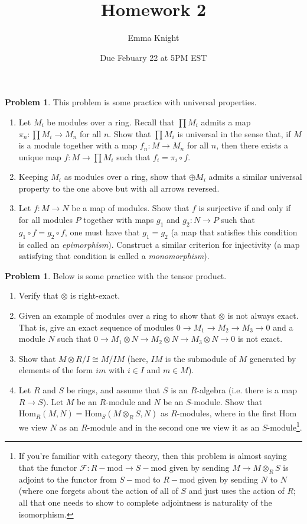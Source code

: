 \documentclass[11pt]{article}
\title{Homework 2}
\author{Emma Knight}
\date{Due Febuary 22 at 5PM EST}
\theoremstyle{definition}
\newtheorem{problem}[theorem]{Problem}
\theoremstyle{definition}
\begin{document}
\maketitle
\begin{problem}This problem is some practice with universal properties.
\begin{enumerate}[label=(\alph*)]
\item Let $M_i$ be modules over a ring.  Recall that $\prod M_i$ admits a map $\pi_n : \prod M_i \rightarrow M_n$ for all $n$.  Show that $\prod M_i$ is universal in the sense that, if $M$ is a module together with a map $f_n: M \rightarrow M_n$ for all $n$, then there exists a unique map $f: M \rightarrow \prod M_i$ such that $f_i = \pi_i \circ f$.
\item Keeping $M_i$ as modules over a ring, show that $\oplus M_i$ admits a similar universal property to the one above but with all arrows reversed.
\item Let $f: M \rightarrow N$ be a map of modules.  Show that $f$ is surjective if and only if for all modules $P$ together with maps $g_1$ and $g_2: N \rightarrow P$ such that $g_1 \circ f = g_2 \circ f$, one must have that $g_1 = g_2$ (a map that satisfies this condition is called an \emph{epimorphism}).  Construct a similar criterion for injectivity (a map satisfying that condition is called a \emph{monomorphism}).
\end{enumerate}
\end{problem}
\begin{problem}Below is some practice with the tensor product.
\begin{enumerate}[label=(\alph*)]
\item Verify that $\otimes$ is right-exact.
\item Given an example of modules over a ring to show that $\otimes$ is not always exact.  That is, give an exact sequence of modules $0\rightarrow M_1\rightarrow M_2\rightarrow M_3\rightarrow 0$ and a module $N$ such that $0\rightarrow M_1\otimes N\rightarrow M_2\otimes N\rightarrow M_3\otimes N\rightarrow 0$ is not exact.
\item Show that $M \otimes R/I \cong M/IM$ (here, $IM$ is the submodule of $M$ generated by elements of the form $im$ with $i \in I$ and $m \in M$).
\item Let $R$ and $S$ be rings, and assume that $S$ is an $R$-algebra (i.e. there is a map $R \rightarrow S$).  Let $M$ be an $R$-module and $N$ be an $S$-module.  Show that $\mathrm{Hom}_{R}(M, N) = \mathrm{Hom}_{S}(M \otimes_{R} S, N)$ as $R$-modules, where in the first $\mathrm{Hom}$ we view $N$ as an $R$-module and in the second one we view it as an $S$-module\footnote{If you're familiar with category theory, then this problem is almost saying that the functor $\mathcal{F}:R-\mathrm{mod} \rightarrow S-\mathrm{mod}$ given by sending $M \rightarrow M\otimes_{R}S$ is adjoint to the functor from $S-\mathrm{mod}$ to $R-\mathrm{mod}$ given by sending $N$ to $N$ (where one forgets about the action of all of $S$ and just uses the action of $R$; all that one needs to show to complete adjointness is naturality of the isomorphism.}.
\end{enumerate}
\end{problem}
\end{document}

